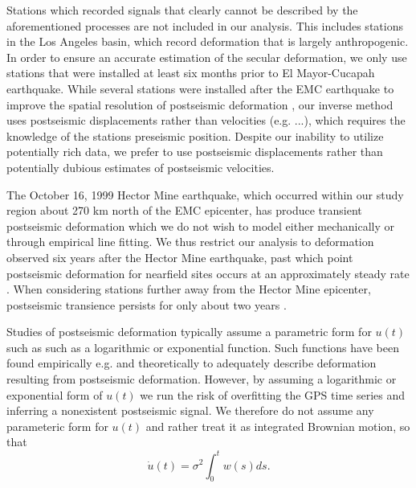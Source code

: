 \documentclass[12pt]{article}
\begin{document}
Stations which recorded signals that clearly cannot be described by the aforementioned processes are not included in our analysis. This includes stations in the Los Angeles basin, which record deformation that is largely anthropogenic. In order to ensure an accurate estimation of the secular deformation, we only use stations that were installed at least six months prior to El Mayor-Cucapah earthquake. While several stations were installed after the EMC earthquake to improve the spatial resolution of postseismic deformation \cite{Spinler2015}, our inverse method uses postseismic displacements rather than velocities (e.g. ...), which requires the knowledge of the stations preseismic position. Despite our inability to utilize potentially rich data, we prefer to use postseismic displacements rather than potentially dubious estimates of postseismic velocities.

The October 16, 1999 Hector Mine earthquake, which occurred within our study region about 270 km north of the EMC epicenter, has produce transient postseismic deformation which we do not wish to model either mechanically or through empirical line fitting. We thus restrict our analysis to deformation observed six years after the Hector Mine earthquake, past which point postseismic deformation for nearfield sites occurs at an approximately steady rate \cite{Savage2009}. When considering stations further away from the Hector Mine epicenter, postseismic transience persists for only about two years \cite{Spinler2015}.

Studies of postseismic deformation typically assume a parametric form for $u(t)$ such as such as a logarithmic or exponential function. Such functions have been found empirically e.g. \cite{Savage2005a} and theoretically \cite{Marone1991} to adequately describe deformation resulting from postseismic deformation. However, by assuming a logarithmic or exponential form of $u(t)$ we run the risk of overfitting the GPS time series and inferring a nonexistent postseismic signal. We therefore do not assume any parameteric form for $u(t)$ and rather treat it as integrated Brownian motion, so that 
\begin{equation}
    \dot{u}(t) = \sigma^2\int_0^t w(s) ds.
\end{equation}    
\end{document}
